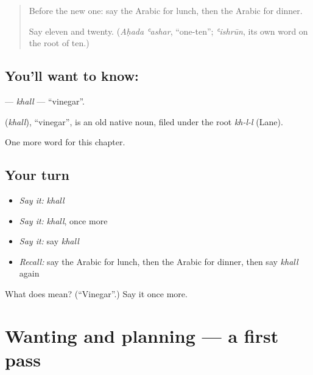 \label{lesson:AR-C119-khall}



\begin{quote}
Before the new one: say the Arabic for lunch, then the Arabic for dinner.

Say eleven and twenty. (\emph{Aḥada ʿashar}, \textquotedblleft{}one-ten\textquotedblright{}; \emph{ʿishrūn}, its own word on the root of ten.)
\end{quote}

\subsection*{You'll want to know: }
\textbf{} — \emph{khall} — \textquotedblleft{}vinegar\textquotedblright{}.

\begin{cousinweb}
\textbf{} (\emph{khall}), \textquotedblleft{}vinegar\textquotedblright{}, is an old native noun, filed under the root \emph{kh-l-l} (Lane).
\end{cousinweb}

\begin{grammarlens}[title={What you've built}]
One more word for this chapter.
\end{grammarlens}

\subsection*{Your turn}
\begin{itemize}
\raggedright
  \item \emph{Say it:} \emph{khall}
  \item \emph{Say it:} \emph{khall}, once more
  \item \emph{Say it:} say \emph{khall}
  \item \emph{Recall:} say the Arabic for lunch, then the Arabic for dinner, then say \emph{khall} again
\end{itemize}

\begin{tcolorbox}[breakable,colback=teal!4,colframe=teal!35!black,title={Before you move on}]
What does  mean? (\textquotedblleft{}Vinegar\textquotedblright{}.) Say it once more.
\end{tcolorbox}
\section[(dialogue)]{Wanting and planning — a first pass}

